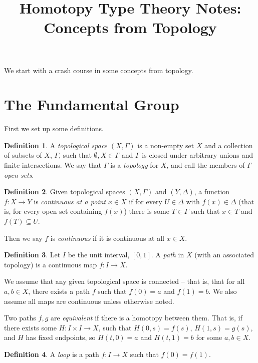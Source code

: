 \documentclass[a4paper,12pt]{article}
\title{Homotopy Type Theory Notes: Concepts from Topology}
\author{}
\newcommand{\sub}{\subseteq}
\theoremstyle{definition}
\newtheorem*{defn}{Definition}
\begin{document}
\maketitle

We start with a crash course in some concepts from topology.

\section{The Fundamental Group}

First we set up some definitions.

\begin{defn}
A \emph{topological space} $(X, \Gamma)$ is a non-empty set $X$ and a collection of subsets of $X$, $\Gamma$, such that $\emptyset, X\in \Gamma$ and $\Gamma$ is closed under arbitrary unions and finite intersections.
We say that $\Gamma$ is a \emph{topology} for $X$, and call the members of $\Gamma$ \emph{open sets}.
\end{defn}

\begin{defn}
Given topological spaces $(X, \Gamma)$ and $(Y, \Delta)$, a function $f: X\to Y$ is \emph{continuous at a point} $x\in X$ if for every $U\in\Delta$ with $f(x)\in \Delta$ (that is, for every open set containing $f(x)$) there is some $T\in \Gamma$ such that $x\in T$ and $f(T)\sub U$.

Then we say $f$ is \emph{continuous} if it is continuous at all $x\in X$.
\end{defn}

\begin{defn}
Let $I$ be the unit interval, $[0, 1]$.
A \emph{path} in $X$ (with an associated topology) is a continuous map $f: I\to X$.
\end{defn}

We assume that any given topological space is connected -- that is, that for all $a, b\in X$, there exists a path $f$ such that $f(0) = a$ and $f(1) = b$.
We also assume all maps are continuous unless otherwise noted.

Two paths $f, g$ are \emph{equivalent} if there is a homotopy between them.
That is, if there exists some $H: I\times I\to X$, such that $H(0, s) = f(s)$, $H(1, s) = g(s)$, and $H$ has fixed endpoints, so $H(t, 0) = a$ and $H(t, 1) = b$ for some $a, b\in X$.

\begin{defn}
A \emph{loop} is a path $f: I\to X$ such that $f(0) = f(1)$.
\end{defn}
\end{document}
